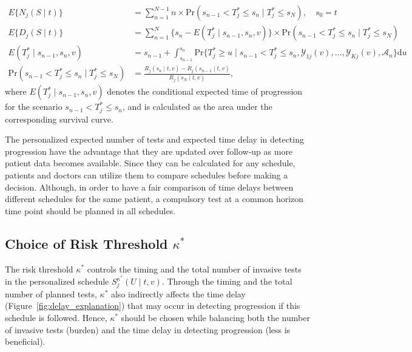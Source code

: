 \begin{equation*}
\label{eq:expected_number_of_tests_and_delay}
\begin{split}
E\big\{N_j(S \mid t)\big\} &= \sum_{n=1}^{N-1} n \times \mbox{Pr}(s_{n-1} < T^*_j \leq s_n \mid T^*_j \leq s_N), \quad s_0 = t\\
E\big\{D_j(S \mid t)\big\} &= \sum_{n=1}^{N} \Big\{s_n - E(T^*_j \mid s_{n-1}, s_n, v)\Big\} \times \mbox{Pr}(s_{n-1} < T^*_j \leq s_n\mid T^*_j \leq s_N)\\
E(T^*_j \mid s_{n-1}, s_n, v) &= s_{n-1} + \int_{s_{n-1}}^{s_n} \mbox{Pr}\Big\{T^*_j \geq u \mid s_{n-1} < T^*_j \leq s_n, \mathcal{Y}_{1j}(v), \ldots, \mathcal{Y}_{Kj}(v), \mathcal{A}_n\Big\} \mathrm{d}u\\
\mbox{Pr}(s_{n-1} < T^*_j \leq s_n\mid T^*_j \leq s_N) &= \frac{R_j(s_n \mid t, v) - R_j(s_{n-1} \mid t, v)}{R_j(s_N \mid t, v)},
\end{split}
\end{equation*}
where $E(T^*_j \mid s_{n-1}, s_n, v)$ denotes the conditional expected time of progression for the scenario $s_{n-1} < T^*_j \leq s_n$, and is calculated as the area under the corresponding survival curve.

The personalized expected number of tests and expected time delay in detecting progression have the advantage that they are updated over follow-up as more patient data becomes available. Since they can be calculated for any schedule, patients and doctors can utilize them to compare schedules before making a decision. Although, in order to have a fair comparison of time delays between different schedules for the same patient, a compulsory test at a common horizon time point should be planned in all schedules.

\subsection{Choice of Risk Threshold $\kappa^*$}
The risk threshold $\kappa^*$ controls the timing and the total number of invasive tests in the personalized schedule $S_j^{\kappa^*}(U \mid t, v)$. Through the timing and the total number of planned tests, $\kappa^*$ also indirectly affects the time delay (Figure~\ref{fig:delay_explanation}) that may occur in detecting progression if this schedule is followed. Hence, $\kappa^*$ should be chosen while balancing both the number of invasive tests (burden) and the time delay in detecting progression (less is beneficial).

